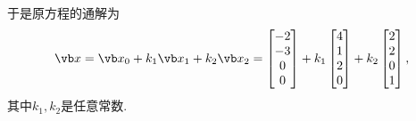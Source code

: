 \begin{example}
\begin{solution}
于是原方程的通解为\[
	\x = \x_0 + k_1 \x_1 + k_2 \x_2
	= \begin{bmatrix} -2 \\ -3 \\ 0 \\ 0 \end{bmatrix}
	+ k_1 \begin{bmatrix} 4 \\ 1 \\ 2 \\ 0 \end{bmatrix}
	+ k_2 \begin{bmatrix} 2 \\ 2 \\ 0 \\ 1 \end{bmatrix},
\]
其中\(k_1,k_2\)是任意常数.
\end{solution}
\end{example}


